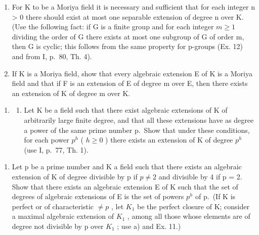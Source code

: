 \begin{enumerate}
\def\labelenumi{\alph{enumi})}
\item
  For K to be a Moriya field it is necessary and sufficient that for each integer n \textgreater{} 0 there should exist at most one separable extension of degree n over K. (Use the following fact: if G is a finite group and for each integer \(m \geqslant 1\) dividing the order of G there exists at most one subgroup of G of order m, then G is cyclic; this follows from the same property for p-groups (Ex. 12) and from I, p.~80, Th. 4).
\item
  If K is a Moriya field, show that every algebraic extension E of K is a Moriya field and that if F is an extension of E of degree m over E, then there exists an extension of K of degree m over K.
\end{enumerate}

\begin{enumerate}
\def\labelenumi{\arabic{enumi})}
\setcounter{enumi}{13}
\tightlist
\item
  \begin{enumerate}
  \def\labelenumii{\alph{enumii})}
  \tightlist
  \item
    Let K be a field such that there exist algebraic extensions of K of arbitrarily large finite degree, and that all these extensions have as degree a power of the same prime number p.~Show that under these conditions, for each power \(p^{h}\) ( \(h \geqslant 0\) ) there exists an extension of K of degree \(p^{h}\) (use I, p.~77, Th. 1).
  \end{enumerate}
\end{enumerate}

\begin{enumerate}
\def\labelenumi{\alph{enumi})}
\setcounter{enumi}{1}
\tightlist
\item
  Let p be a prime number and K a field such that there exists an algebraic extension of K of degree divisible by p if \(p \neq 2\) and divisible by 4 if p = 2. Show that there exists an algebraic extension E of K such that the set of degrees of algebraic extensions of E is the set of powers \(p^{h}\) of p.~(If K is perfect or of characteristic \(\neq p\) , let \(K_{1}\) be the perfect closure of K; consider a maximal algebraic extension of \(K_{1}\) , among all those whose elements are of degree not divisible by p over \(K_{1}\) ; use a) and Ex. 11.)
\end{enumerate}

